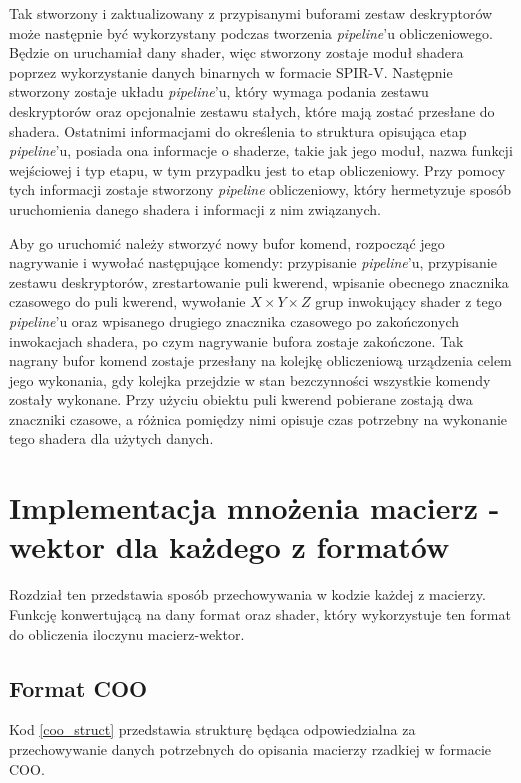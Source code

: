 Tak stworzony i zaktualizowany z przypisanymi buforami zestaw deskryptorów może następnie być wykorzystany podczas tworzenia \textit{pipeline}'u obliczeniowego.
Będzie on uruchamiał dany shader, więc stworzony zostaje moduł shadera poprzez wykorzystanie danych binarnych w formacie SPIR-V.
Następnie stworzony zostaje układu \textit{pipeline}'u, który wymaga podania zestawu deskryptorów oraz opcjonalnie zestawu stałych, które mają zostać przesłane do shadera.
Ostatnimi informacjami do określenia to struktura opisująca etap \textit{pipeline}'u, posiada ona informacje o shaderze, takie jak jego moduł, nazwa funkcji wejściowej i typ etapu, w tym przypadku jest to etap obliczeniowy.
Przy pomocy tych informacji zostaje stworzony \textit{pipeline} obliczeniowy, który hermetyzuje sposób uruchomienia danego shadera i informacji z nim związanych.

Aby go uruchomić należy stworzyć nowy bufor komend, rozpocząć jego nagrywanie i wywołać następujące komendy: przypisanie \textit{pipeline}'u, przypisanie zestawu deskryptorów, zrestartowanie puli kwerend, wpisanie obecnego znacznika czasowego do puli kwerend, wywołanie $X \times Y \times Z$ grup inwokujący shader z tego \textit{pipeline}'u oraz wpisanego drugiego znacznika czasowego po zakończonych inwokacjach shadera, po czym nagrywanie bufora zostaje zakończone.
Tak nagrany bufor komend zostaje przesłany na kolejkę obliczeniową urządzenia celem jego wykonania, gdy kolejka przejdzie w stan bezczynności wszystkie komendy zostały wykonane.
Przy użyciu obiektu puli kwerend pobierane zostają dwa znaczniki czasowe, a różnica pomiędzy nimi opisuje czas potrzebny na wykonanie tego shadera dla użytych danych.

\section{Implementacja mnożenia macierz - wektor dla każdego z formatów }
\label{cha:impl_matrix_vec}

Rozdział ten przedstawia sposób przechowywania w kodzie każdej z macierzy.
Funkcję konwertującą na dany format oraz shader, który wykorzystuje ten format do obliczenia iloczynu macierz-wektor.

\subsection{Format COO}
\label{cha:coo_impl}

Kod \ref{coo_struct} przedstawia strukturę będąca odpowiedzialna za przechowywanie danych potrzebnych do opisania macierzy rzadkiej w formacie COO.

